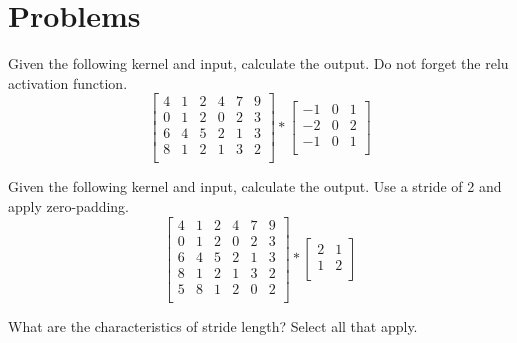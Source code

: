 \documentclass{exam}
\begin{document}
\section{Problems}
\begin{questions}

\question[4] Given the following kernel and input, calculate the output. Do not forget the relu activation function.
\[
\begin{bmatrix}
    4 & 1 & 2 & 4 & 7 & 9\\
    0 & 1 & 2 & 0 & 2 & 3\\
    6 & 4 & 5 & 2 & 1 & 3\\
    8 & 1 & 2 & 1 & 3 & 2\\
\end{bmatrix}
 *
\begin{bmatrix}
    -1 & 0 & 1\\
    -2 & 0 & 2\\
    -1 & 0 & 1\\
\end{bmatrix}
\]

\question[4] Given the following kernel and input, calculate the output. Use a stride of 2 and apply zero-padding.
\[
\begin{bmatrix}
    4 & 1 & 2 & 4 & 7 & 9\\
    0 & 1 & 2 & 0 & 2 & 3\\
    6 & 4 & 5 & 2 & 1 & 3\\
    8 & 1 & 2 & 1 & 3 & 2\\
    5 & 8 & 1 & 2 & 0 & 2\\
\end{bmatrix}
 *
\begin{bmatrix}
    2 & 1\\
    1 & 2\\
\end{bmatrix}
\]

\question[2] What are the characteristics of stride length? Select all that apply.
\end{questions}
\end{document}
